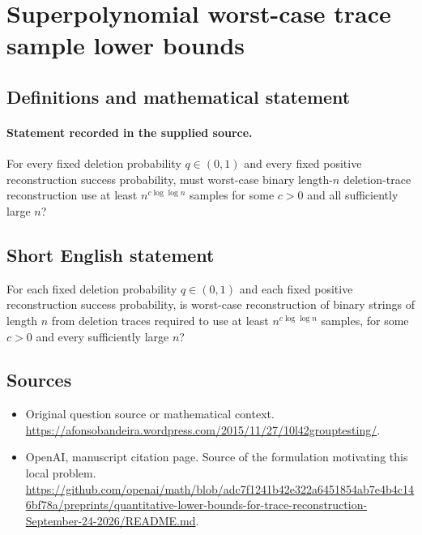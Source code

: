 \documentclass[11pt]{article}
\begin{document}
\section*{Superpolynomial worst-case trace sample lower bounds}\label{30007499}
\subsection{Definitions and mathematical statement}
\paragraph{Statement recorded in the supplied source.}
For every fixed deletion probability $q\in(0,1)$ and every fixed positive reconstruction success probability, must worst-case binary length-$n$ deletion-trace reconstruction use at least $n^{c\log\log n}$ samples for some $c>0$ and all sufficiently large $n$?
\subsection{Short English statement}
For each fixed deletion probability $q\in(0,1)$ and each fixed positive reconstruction success probability, is worst-case reconstruction of binary strings of length $n$ from deletion traces required to use at least $n^{c\log\log n}$ samples, for some $c>0$ and every sufficiently large $n$?
\subsection{Sources}
\begin{itemize}
\item[S1] Original question source or mathematical context.
\url{https://afonsobandeira.wordpress.com/2015/11/27/10l42grouptesting/}.
\item[S2] OpenAI, manuscript citation page. Source of the formulation motivating this local problem.
\url{https://github.com/openai/math/blob/adc7f1241b42e322a6451854ab7e4b4c146bf78a/preprints/quantitative-lower-bounds-for-trace-reconstruction-September-24-2026/README.md}.
\end{itemize}
\end{document}
